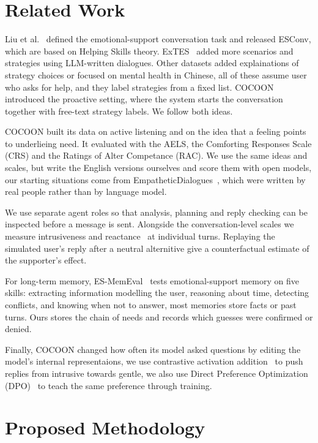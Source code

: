 \documentclass[journal]{IEEEtran}
\begin{document}
\section{Related Work}
Liu et al.~\cite{liu2021} defined the emotional-support conversation task and released ESConv, which are based on Helping Skills theory. ExTES~\cite{zheng2024} added more scenarios and strategies using LLM-written dialogues. Other datasets added explainations of strategy choices or focused on mental health in Chinese, all of these assume user who asks for help, and they label strategies from a fixed list. COCOON~\cite{fu2025} introduced the proactive setting, where the system starts the conversation together with free-text strategy labels. We follow both ideas.

COCOON built its data on active listening and on the idea that a feeling points to underlieing need. It evaluated with the AELS, the Comforting Responses Scale (CRS) and the Ratings of Alter Competance (RAC). We use the same ideas and scales, but write the English versions ourselves and score them with open models, our starting situations come from EmpatheticDialogues~\cite{rashkin2019}, which were written by real people rather than by language model.

We use separate agent roles so that analysis, planning and reply checking can be inspected before a message is sent. Alongside the conversation-level scales we measure intrusiveness and reactance~\cite{dillard2005} at individual turns. Replaying the simulated user's reply after a neutral alternitive give a counterfactual estimate of the supporter's effect.

For long-term memory, ES-MemEval~\cite{chen2026} tests emotional-support memory on five skills: extracting information modelling the user, reasoning about time, detecting conflicts, and knowing when not to answer, most memories store facts or past turns. Ours stores the chain of needs and records which guesses were confirmed or denied.

Finally, COCOON changed how often its model asked questions by editing the model's internal representaions, we use contrastive activation addition~\cite{rimsky2024} to push replies from intrusive towards gentle, we also use Direct Preference Optimization (DPO)~\cite{rafailov2023} to teach the same preference through training.

\section{Proposed Methodology}
\end{document}
